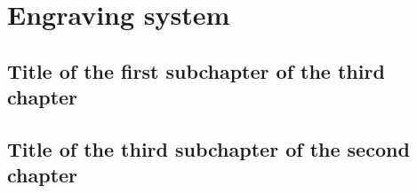 \chapter{Engraving system}
\label{chap:EngravingSystem}

\section{Title of the first subchapter of the third chapter}

\section{Title of the third subchapter of the second chapter}
